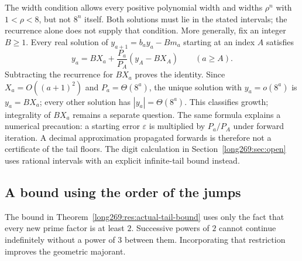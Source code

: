 The width condition allows every positive polynomial width and widths
$\rho^n$ with $1<\rho<8$, but not $8^n$ itself.  Both solutions must lie in
the stated intervals; the recurrence alone does not supply that condition.
More generally, fix an integer $B\ge1$.  Every real solution of
$y_{a+1}=b_ay_a-Bm_a$ starting at an index $A$ satisfies
\[
 y_a=BX_a+\frac{P_a}{P_A}(y_A-BX_A)\qquad(a\ge A).
\]
Subtracting the recurrence for $BX_a$ proves the identity.  Since
$X_a=O((a+1)^2)$ and $P_a=\Theta(8^a)$, the unique solution with
$y_a=o(8^a)$ is $y_a=BX_a$; every other solution has
$|y_a|=\Theta(8^a)$.  This classifies growth; integrality of $BX_a$
remains a separate question.
The same formula explains a numerical precaution: a starting error
$\varepsilon$ is multiplied by $P_a/P_A$ under forward iteration.
A decimal approximation propagated forwards is therefore not a
certificate of the tail floors.  The digit calculation in
Section~\ref{long269:sec:open} uses rational intervals with an explicit
infinite-tail bound instead.

\subsection{A bound using the order of the jumps}\label{long269:sec:smaller-bound}
The bound in Theorem~\ref{long269:res:actual-tail-bound} uses only the fact
that every new prime factor is at least $2$. Successive powers of $2$
cannot continue indefinitely without a power of $3$ between them.
Incorporating that restriction improves the geometric majorant.

